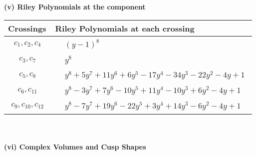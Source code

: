 \documentclass[1p]{elsarticle_modified}
\theoremstyle{definition}
\begin{document}
\newpage\renewcommand{\arraystretch}{1}
\flushleft \textbf{(v) Riley Polynomials at the component}\newline \\
\begin{tabular}{m{50pt}|m{274pt}}
Crossings & \hspace{64pt}Riley Polynomials at each crossing \\
\hline $$\begin{aligned}c_{1},c_{2},c_{4}\end{aligned}$$&$\begin{aligned}
&(y-1)^8
\end{aligned}$\\
\hline $$\begin{aligned}c_{3},c_{7}\end{aligned}$$&$\begin{aligned}
&y^8
\end{aligned}$\\
\hline $$\begin{aligned}c_{5},c_{8}\end{aligned}$$&$\begin{aligned}
&y^8+5 y^7+11 y^6+6 y^5-17 y^4-34 y^3-22 y^2-4 y+1
\end{aligned}$\\
\hline $$\begin{aligned}c_{6},c_{11}\end{aligned}$$&$\begin{aligned}
&y^8-3 y^7+7 y^6-10 y^5+11 y^4-10 y^3+6 y^2-4 y+1
\end{aligned}$\\
\hline $$\begin{aligned}c_{9},c_{10},c_{12}\end{aligned}$$&$\begin{aligned}
&y^8-7 y^7+19 y^6-22 y^5+3 y^4+14 y^3-6 y^2-4 y+1
\end{aligned}$\\
\hline
\end{tabular}\\~\\
\newpage\flushleft \textbf{(vi) Complex Volumes and Cusp Shapes}
\end{document}
